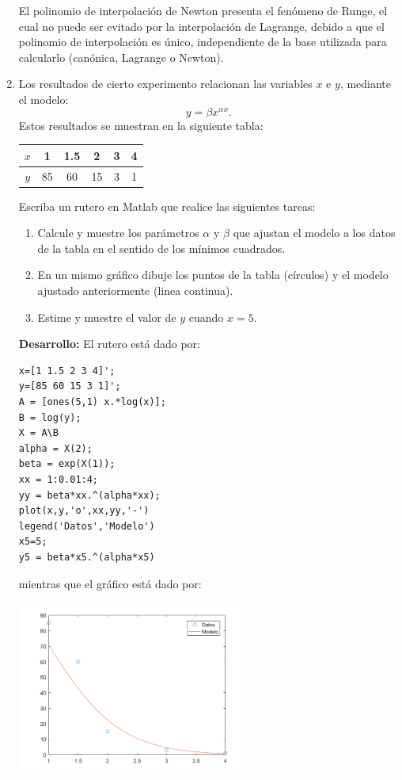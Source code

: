 \documentclass[letter,11pt]{article}
\newcommand{\matlab}{{\sc Matlab} }
\begin{document}
\begin{enumerate}
El polinomio de interpolaci\'on de Newton presenta el fen\'omeno de Runge, el cual no puede ser evitado por la interpolaci\'on de Lagrange, debido a que el polinomio de interpolaci\'on es \'unico, independiente de la base utilizada para calcularlo (can\'onica, Lagrange o Newton).

\item Los resultados de cierto experimento relacionan las variables $x$ e $y$, mediante el modelo:
$$
y=\beta x^{\alpha x}.
$$
Estos resultados se muestran en la siguiente tabla:
\begin{center}
\begin{tabular}{c|ccccc}
$x$ & 1 & 1.5 & 2 & 3 & 4\\
\hline
$y$ & 85 & 60 & 15 & 3 & 1
\end{tabular}
\end{center}
Escriba un rutero en \matlab que realice las siguientes tareas:
\begin{enumerate}
\item Calcule y muestre los par\'ametros $\alpha$ y $\beta$ que ajustan el modelo a los datos de la tabla en el sentido de los m\'inimos cuadrados.
\item En un mismo gr\'afico dibuje los puntos de la tabla (c\'irculos) y el modelo ajustado anteriormente (linea continua).
\item Estime y muestre el valor de $y$ cuando $x=5$.
\end{enumerate}

\textbf{Desarrollo:} El rutero est\'a dado por:

\begin{lstlisting}
x=[1 1.5 2 3 4]';
y=[85 60 15 3 1]';
A = [ones(5,1) x.*log(x)];
B = log(y);
X = A\B
alpha = X(2);
beta = exp(X(1));
xx = 1:0.01:4;
yy = beta*xx.^(alpha*xx);
plot(x,y,'o',xx,yy,'-')
legend('Datos','Modelo')
x5=5;
y5 = beta*x5.^(alpha*x5)
\end{lstlisting}
mientras que el gr\'afico est\'a dado por:

\centerline{\includegraphics[width=0.6\textwidth]{mincuad.png}}
\end{enumerate}
\end{document}
